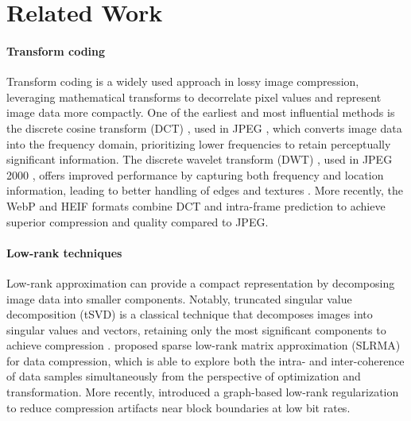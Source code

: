 \section{Related Work} \label{sec:related_work}

\paragraph{Transform coding}
Transform coding is a widely used approach in lossy image compression, leveraging mathematical transforms to decorrelate pixel values and represent image data more compactly. One of the earliest and most influential methods is the discrete cosine transform (DCT) \cite{ahmed1974discrete}, used in JPEG \cite{wallace1991jpeg}, which converts image data into the frequency domain, prioritizing lower frequencies to retain perceptually significant information. The discrete wavelet transform (DWT) \cite{antonini1992image}, used in JPEG 2000 \cite{skodras2001jpeg}, offers improved performance by capturing both frequency and location information, leading to better handling of edges and textures \cite{shapiro1993embedded}. More recently, the WebP \cite{google2011webp} and HEIF \cite{lainema2016hevc, hannuksela2015high} formats combine DCT and intra-frame prediction to achieve superior compression and quality compared to JPEG.

\paragraph{Low-rank techniques}
Low-rank approximation can provide a compact representation by decomposing image data into smaller components. Notably, truncated singular value decomposition (tSVD) is a classical technique that decomposes images into singular values and vectors, retaining only the most significant components to achieve compression \cite{andrews1976singular, prasantha2007image}. \textcite{hou2015sparse} proposed sparse low-rank matrix approximation (SLRMA) for data compression, which is able to explore both the intra- and inter-coherence of data samples simultaneously from the perspective of optimization and transformation.
More recently, \textcite{yuan2020image} introduced a graph-based low-rank regularization to reduce compression artifacts near block boundaries at low bit rates.

